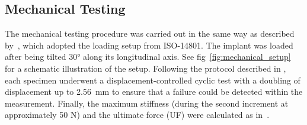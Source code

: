 \documentclass[12pt, a4paper, twoside]{report}
\begin{document}
\begin{figure}[H]
\centering 
{}
\label{fig:setup}
\end{figure}
%
\subsection{Mechanical Testing}
%
The mechanical testing procedure was carried out in the same way as described by~\citet{thierrin_primary_2022}, which adopted the loading setup from ISO-14801.
The implant was loaded after being tilted 30° along its longitudinal axis.
See fig~\ref{fig:mechanical_setup} for a schematic illustration of the setup.
Following the protocol described in \cite{voumard_intra_operative_2015}, each specimen underwent a displacement-controlled cyclic test with a doubling of displacement up to 2.56~mm to ensure that a failure could be detected within the measurement.
Finally, the maximum stiffness (during the second increment at approximately 50 N) and the ultimate force (UF) were calculated as in~\cite{wili_experimental_2021}.
\end{document}

